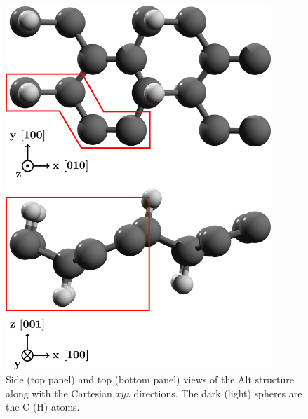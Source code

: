 \documentclass[floatfix,prb,aps,superscriptaddress,showpacs,11pt,preprint,letterpaper]{revtex4}
\def\tama{10cm}
\begin{document}
\begin{figure}[ht!]
    \centering
    \includegraphics[width=\tama]{figures/fig2}
    \caption{Side (top panel) and top (bottom panel) views of the Alt
      structure along with the 
      Cartesian $xyz$ directions. The dark (light) spheres are the C (H) atoms.
}
    \label{fig:alt-struc}
\end{figure}
\end{document}

